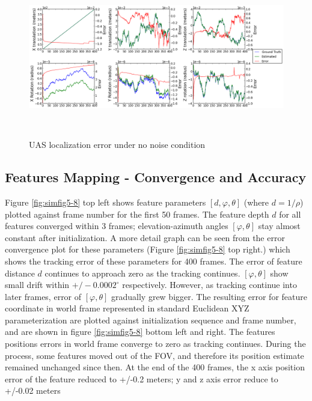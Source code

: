 \begin{figure}[h]
\centering
\includegraphics[width=15cm, height=7cm]{./Figures/SimulationFigures/Figure1.png}
\caption{UAS localization error under no noise condition}
\label{fig:simfig1}
\end{figure}
\FloatBarrier

\subsection{Features Mapping - Convergence and Accuracy}

Figure \ref{fig:simfig5-8} top left shows feature parameters $[d,
\varphi ,\theta]$ (where $d=1/\rho $) plotted against frame number for
the first 50 frames. The feature depth $d$ for all features converged
within 3 frames; elevation-azimuth angles $[\varphi ,\theta]$ stay
almost constant after initialization. A more detail graph can be seen
from the error convergence plot for these parameters (Figure
\ref{fig:simfig5-8} top right.) which shows the tracking error of
these parameters for 400 frames. The error of feature distance $d$
continues to approach zero as the tracking continues. $[\varphi
,\theta]$ show small drift within $+/-0.0002^{\circ}$ respectively.
However, as tracking continue into later frames, error of $[\varphi
,\theta]$ gradually grew bigger. The resulting error for feature
coordinate in world frame represented in standard Euclidean XYZ
parameterization are plotted against initialization sequence and frame
number, and are shown in figure \ref{fig:simfig5-8} bottom left
and right. The features positions errors in world frame converge to
zero as tracking continues. During the process, some features moved
out of the FOV, and therefore its position estimate remained
unchanged since then. At the end of the 400 frames, the x axis
position error of the feature reduced to +/-0.2 meters; y and z axis
error reduce to +/-0.02 meters

